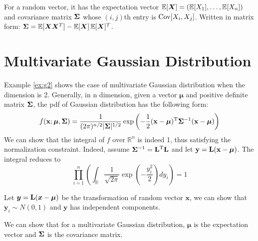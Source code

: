 For a random vector, it has the expectation vector $\operatorname{\mathbb{E}}[\bm{X}] = (\operatorname{\mathbb{E}}[X_1], \dots, \operatorname{\mathbb{E}}[X_n])$ and covariance matrix $\mathbf{\Sigma} $ whose $(i,j)$th entry is $\operatorname{Cov}[X_i, X_j]$. Written in matrix form:
$ \mathbf{\Sigma} = \operatorname{\mathbb{E}}[\bm{X}\bm{X}^T] - \operatorname{\mathbb{E}}[\bm{X}] \operatorname{\mathbb{E}}[\bm{X}]^T $.

\section{Multivariate Gaussian Distribution}
Example \ref{ex:g2} shows the case of multivariate Gaussian distribution when the dimension is 2. Generally, in n dimension, given a vector $\bm{\mu}$ and positive definite matrix $\mathbf{\Sigma}$, the pdf of Gaussian distribution has the following form:
\begin{equation}
f(\mathbf{x}; \bm{\mu}, \mathbf{\Sigma}) = \frac{1}{(2\pi)^{n/2} \lvert\mathbf{\Sigma}\rvert^{1/2}} \exp \left(-\frac{1}{2} (\mathbf{x} - \bm{\mu})^{\mathrm{T}} \mathbf{\Sigma}^{-1} (\mathbf{x} - \bm{\mu})\right)
\end{equation}
We can show that the integral of $f$ over $\mathbb{R}^n$ is indeed 1, thus satisfying the normalization constraint. Indeed, assume $\mathbf{\Sigma}^{-1} = \mathbf{L}^{\mathrm{T}} \mathbf{L}$ and let $\mathbf{y} = \mathbf{L} (\mathbf{x} - \bm{\mu})$. The integral reduces to
$$
\prod_{i=1}^n \left(\int_{\mathbb{R}}\frac{1}{\sqrt{2\pi}} \exp(-\frac{y^2_i}{2}) dy_i\right) = 1
$$

Let $\bm{y} = \mathbf{L} (\bm{x} - \bm{\mu})$ be the transformation of random vector $\bm{x}$, we can show that $\bm{y}_i \sim N(0, 1)$ and $\bm{y}$ has independent components.  

We can show that for a multivariate Gaussian distribution, $\bm{\mu}$ is the expectation vector and $\mathbf{\Sigma}$ is the covariance matrix.